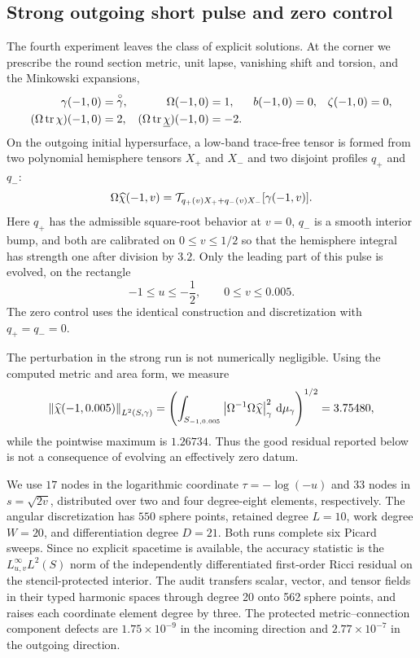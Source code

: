 \subsection{Strong outgoing short pulse and zero control}

The fourth experiment leaves the class of explicit solutions.  At the corner
we prescribe the round section metric, unit lapse, vanishing shift and
torsion, and the Minkowski expansions,
\begin{equation}
  \begin{aligned}
    \gamma(-1,0)&=\overset{\circ}{\gamma},& \Omega(-1,0)&=1,&
    b(-1,0)&=0,& \zeta(-1,0)&=0,\\
    (\Omega\operatorname{tr}\chi)(-1,0)&=2,&
    (\Omega\operatorname{tr}\underline\chi)(-1,0)&=-2.&&
  \end{aligned}
\end{equation}
On the outgoing initial hypersurface, a low-band trace-free tensor is formed
from two polynomial hemisphere tensors $X_+$ and $X_-$ and two disjoint
profiles $q_+$ and $q_-$:
\begin{equation}\label{eq:results-exp4-pulse}
  \Omega\widehat\chi(-1,v)
  =\mathcal T_{q_+(v)X_++q_-(v)X_-}[\gamma(-1,v)].
\end{equation}
Here $q_+$ has the admissible square-root behavior at $v=0$, $q_-$ is a
smooth interior bump, and both are calibrated on $0\leq v\leq1/2$ so that
the hemisphere integral has strength one after division by $3.2$.  Only the
leading part of this pulse is evolved, on the rectangle
\begin{equation}
  -1\leq u\leq-\frac12,\qquad 0\leq v\leq0.005.
\end{equation}
The zero control uses the identical construction and discretization with
$q_+=q_-=0$.

The perturbation in the strong run is not numerically negligible.  Using the
computed metric and area form, we measure
\begin{equation}
  \left\lVert \widehat\chi(-1,0.005)\right\rVert_{L^2(S,\gamma)}
  =\left(\int_{S_{-1,0.005}}
      \left\lvert \Omega^{-1}\Omega\widehat\chi\right\rvert_{\gamma}^{2}\,
      \mathop{}\!\mathrm d\mu_{\gamma}\right)^{1/2}
  =3.75480,
\end{equation}
while the pointwise maximum is $1.26734$.  Thus the good residual reported
below is not a consequence of evolving an effectively zero datum.

We use $17$ nodes in the logarithmic coordinate $\tau=-\log(-u)$ and $33$
nodes in $s=\sqrt{2v}$, distributed over two and four degree-eight elements,
respectively.  The angular discretization has $550$ sphere points, retained
degree $L=10$, work degree $W=20$, and differentiation degree $D=21$.  Both
runs complete six Picard sweeps.  Since no explicit spacetime is available,
the accuracy statistic is the $L^\infty_{u,v}L^2(S)$ norm of the independently
differentiated first-order Ricci residual on the stencil-protected interior.
The audit transfers scalar, vector, and tensor fields in their typed harmonic
spaces through degree 20 onto 562 sphere points, and raises each coordinate
element degree by three. The protected metric--connection component defects
are $1.75\times10^{-9}$ in the incoming direction and
$2.77\times10^{-7}$ in the outgoing direction.


